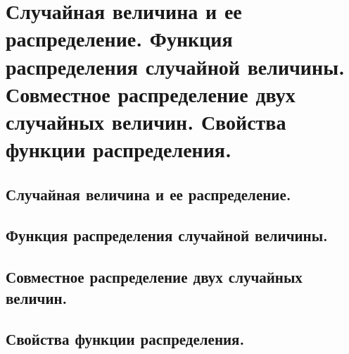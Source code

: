 \section{Случайная величина и ее распределение. Функция распределения случайной величины. Совместное распределение двух случайных величин. Свойства функции распределения.}

\subsection{Случайная величина и ее распределение.}

\subsection{Функция распределения случайной величины.}

\subsection{Совместное распределение двух случайных величин.}

\subsection{Свойства функции распределения.}